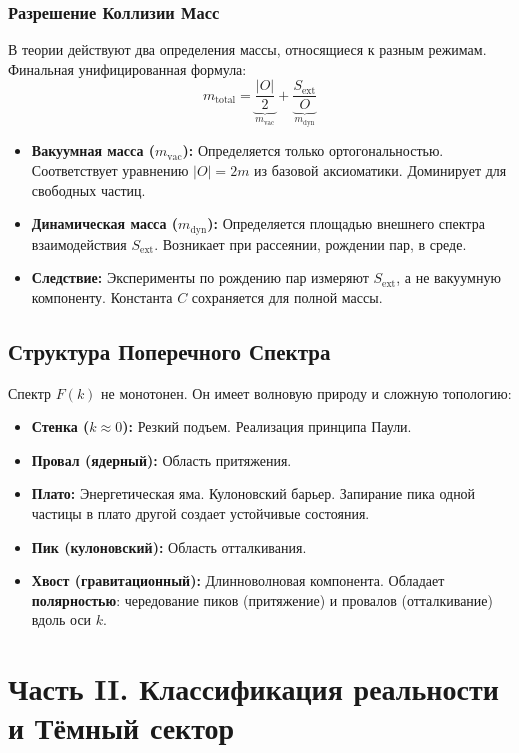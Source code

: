 \documentclass[12pt,a4paper]{article}
\begin{document}
\subsubsection{Разрешение Коллизии Масс}
В теории действуют два определения массы, относящиеся к разным режимам. Финальная унифицированная формула:
\begin{equation}
    m_{\text{total}} = \underbrace{\frac{|O|}{2}}_{m_{\text{vac}}} + \underbrace{\frac{S_{\text{ext}}}{O}}_{m_{\text{dyn}}}
\end{equation}
\begin{itemize}
    \item \textbf{Вакуумная масса ($m_{\text{vac}}$):} Определяется только ортогональностью. Соответствует уравнению $|O|=2m$ из базовой аксиоматики. Доминирует для свободных частиц.
    \item \textbf{Динамическая масса ($m_{\text{dyn}}$):} Определяется площадью внешнего спектра взаимодействия $S_{\text{ext}}$. Возникает при рассеянии, рождении пар, в среде.
    \item \textbf{Следствие:} Эксперименты по рождению пар измеряют $S_{\text{ext}}$, а не вакуумную компоненту. Константа $C$ сохраняется для полной массы.
\end{itemize}

\subsection{Структура Поперечного Спектра}
Спектр $F(k)$ не монотонен. Он имеет волновую природу и сложную топологию:
\begin{itemize}
    \item \textbf{Стенка ($k \approx 0$):} Резкий подъем. Реализация принципа Паули.
    \item \textbf{Провал (ядерный):} Область притяжения.
    \item \textbf{Плато:} Энергетическая яма. Кулоновский барьер. Запирание пика одной частицы в плато другой создает устойчивые состояния.
    \item \textbf{Пик (кулоновский):} Область отталкивания.
    \item \textbf{Хвост (гравитационный):} Длинноволновая компонента. Обладает \textbf{полярностью}: чередование пиков (притяжение) и провалов (отталкивание) вдоль оси $k$.
\end{itemize}

\section{Часть II. Классификация реальности и Тёмный сектор}
\end{document}
